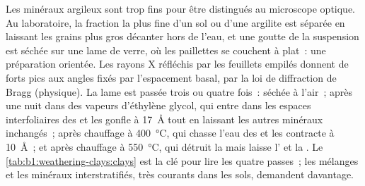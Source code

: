 \begin{inthelab}
Les minéraux argileux sont trop fins pour être distingués au microscope optique. Au
laboratoire, la fraction la plus fine d'un sol ou d'une argilite est séparée en
laissant les grains plus gros décanter hors de l'eau, et une goutte de la suspension est
séchée sur une lame de verre, où les paillettes se couchent à plat~: une préparation orientée. Les rayons X
réfléchis par les feuillets empilés donnent de forts pics aux angles fixés par
l'espacement basal, par la loi de diffraction de Bragg (physique). La lame est passée trois
ou quatre fois~: séchée à l'air~; après une nuit dans des vapeurs d'éthylène glycol, qui entre dans
les espaces interfoliaires des  et les gonfle à \SI{17}{\angstrom} tout en laissant
les autres minéraux inchangés~; après chauffage à \SI{400}{\celsius}, qui chasse
l'eau des  et les contracte à \SI{10}{\angstrom}~; et après
chauffage à \SI{550}{\celsius}, qui détruit la  mais laisse l' et
la . Le \cref{tab:b1:weathering-clays:clays} est la clé pour lire les quatre
passes~; les mélanges et les minéraux interstratifiés, très courants dans les sols, demandent davantage.
\end{inthelab}

